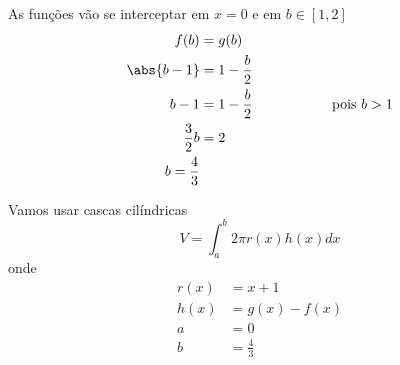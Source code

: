 \documentclass[a4paper,12pt,fleqn]{article}
\begin{document}
\begin{answer}
As funções vão se interceptar em $x=0$ e em $b\in[1, 2]$
\begin{align*}
  f(b)            & = g(b)                                             \\
  \abs{b-1}       & = 1 - \frac{b}{2}                                  \\
  b-1             & = 1 - \frac{b}{2} \hspace{20mm} \text{pois } b > 1 \\
  \frac{3}{2} b   & = 2                                                \\
  b = \frac{4}{3} &
\end{align*}

Vamos usar cascas cilíndricas
\[
  V = \int_a^b 2\pi r(x) h(x) dx
\]
onde
\begin{align*}
  r(x) & = x + 1       \\
  h(x) & = g(x) - f(x) \\
  a    & = 0           \\
  b    & = \frac{4}{3}
\end{align*}


\end{answer}
\end{document}
